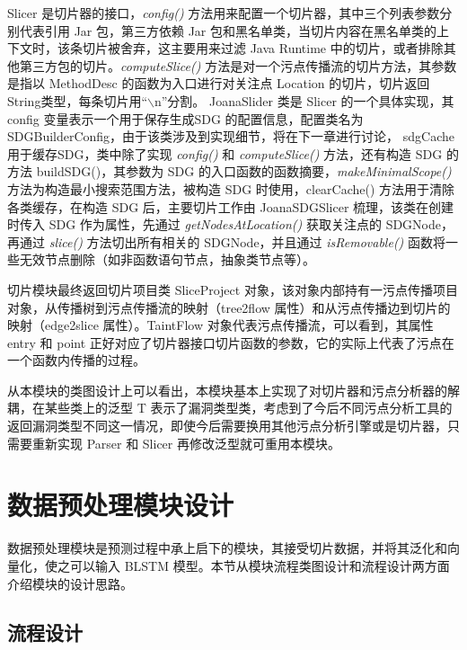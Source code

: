 Slicer 是切片器的接口，\textit{config()} 方法用来配置一个切片器，其中三个列表参数分别代表引用 Jar 包，第三方依赖 Jar 包和黑名单类，当切片内容在黑名单类的上下文时，该条切片被舍弃，这主要用来过滤 Java Runtime 中的切片，或者排除其他第三方包的切片。\textit{computeSlice()} 方法是对一个污点传播流的切片方法，其参数是指以 MethodDesc 的函数为入口进行对关注点 Location 的切片，切片返回String类型，每条切片用“$\backslash$n”分割。 JoanaSlider 类是 Slicer 的一个具体实现，其 config 变量表示一个用于保存生成SDG 的配置信息，配置类名为 SDGBuilderConfig，由于该类涉及到实现细节，将在下一章进行讨论， sdgCache 用于缓存SDG，类中除了实现 \textit{config()} 和 \textit{computeSlice()} 方法，还有构造 SDG 的方法 buildSDG()，其参数为 SDG 的入口函数的函数摘要，\textit{makeMinimalScope()} 方法为构造最小搜索范围方法，被构造 SDG 时使用，clearCache() 方法用于清除各类缓存，在构造 SDG 后，主要切片工作由 JoanaSDGSlicer 梳理，该类在创建时传入 SDG 作为属性，先通过 \textit{getNodesAtLocation()} 获取关注点的 SDGNode，再通过 \textit{slice()} 方法切出所有相关的 SDGNode，并且通过 \textit{isRemovable()} 函数将一些无效节点删除（如非函数语句节点，抽象类节点等）。

切片模块最终返回切片项目类 SliceProject 对象，该对象内部持有一污点传播项目对象，从传播树到污点传播流的映射（tree2flow 属性）和从污点传播边到切片的映射（edge2slice 属性）。TaintFlow 对象代表污点传播流，可以看到，其属性 entry 和 point 正好对应了切片器接口切片函数的参数，它的实际上代表了污点在一个函数内传播的过程。

从本模块的类图设计上可以看出，本模块基本上实现了对切片器和污点分析器的解耦，在某些类上的泛型 T 表示了漏洞类型类，考虑到了今后不同污点分析工具的返回漏洞类型不同这一情况，即使今后需要换用其他污点分析引擎或是切片器，只需要重新实现 Parser 和 Slicer 再修改泛型就可重用本模块。

\section{数据预处理模块设计}

数据预处理模块是预测过程中承上启下的模块，其接受切片数据，并将其泛化和向量化，使之可以输入 BLSTM 模型。本节从模块流程类图设计和流程设计两方面介绍模块的设计思路。\\


\subsection{流程设计}

